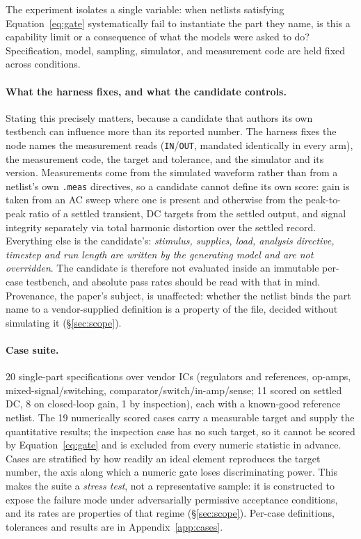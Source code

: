 The experiment isolates a single variable: when netlists satisfying
Equation~\ref{eq:gate} systematically fail to instantiate the part they name,
is this a capability limit or a consequence of what the models were asked to
do? Specification, model, sampling, simulator, and measurement code are held
fixed across conditions.

\paragraph{What the harness fixes, and what the candidate controls.}
Stating this precisely matters, because a candidate that authors its own
testbench can influence more than its reported number. The harness fixes the
node names the measurement reads (\texttt{IN}/\texttt{OUT}, mandated
identically in every arm), the measurement code, the target and tolerance, and
the simulator and its version. Measurements come from the simulated waveform
rather than from a netlist's own \texttt{.meas} directives, so a candidate
cannot define its own score: gain is taken from an AC sweep where one is
present and otherwise from the peak-to-peak ratio of a settled transient, DC
targets from the settled output, and signal integrity separately via total
harmonic distortion over the settled record. Everything else is the
candidate's: \emph{stimulus, supplies, load, analysis directive, timestep and
run length are written by the generating model and are not overridden}. The
candidate is therefore not evaluated inside an immutable per-case testbench,
and absolute pass rates should be read with that in mind. Provenance, the
paper's subject, is unaffected: whether the netlist binds the part name to a
vendor-supplied definition is a property of the file, decided without
simulating it (\S\ref{sec:scope}).

\paragraph{Case suite.}
20 single-part specifications over vendor ICs (regulators and references,
op-amps, mixed-signal/switching, comparator/switch/in-amp/sense; 11 scored on
settled DC, 8 on closed-loop gain, 1 by inspection), each with a known-good
reference netlist. The 19 numerically scored cases carry a measurable target
and supply the quantitative results; the inspection case has no such target,
so it cannot be scored by Equation~\ref{eq:gate} and is excluded from every
numeric statistic in advance. Cases are stratified by how readily an ideal
element reproduces the target number, the axis along which a numeric gate
loses discriminating power. This makes the suite a \emph{stress test}, not a
representative sample: it is constructed to expose the failure mode under
adversarially permissive acceptance conditions, and its rates are properties
of that regime (\S\ref{sec:scope}). Per-case definitions, tolerances and
results are in Appendix~\ref{app:cases}.

